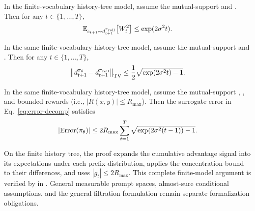 \begin{lemma}
\label{lem:wt-second-moment}
In the finite-vocabulary history-tree model, assume the mutual-support  and .
Then for any $t\in\{1,\ldots,T\}$,
\begin{equation*}
    \mathbb{E}_{c_{t+1}\sim d_{t+1}^{\pi_{\mathrm{roll}}}}\!\left[W_t^2\right] \le \exp(2\sigma^2 t).
\end{equation*}
\end{lemma}

\begin{corollary}
\label{cor:tv-prefix-subgaussian}
In the same finite-vocabulary history-tree model, assume the mutual-support  and
. Then for any $t\in\{1,\ldots,T\}$,
\begin{equation*}
    \bigl\|d_{t+1}^{\pi_{\theta}} - d_{t+1}^{\pi_{\mathrm{roll}}}\bigr\|_{\mathrm{TV}}
    \le
    \frac{1}{2}\sqrt{\exp(2\sigma^2 t) - 1}.
\end{equation*}
\end{corollary}

\begin{theorem}
\label{thm:per-position-error-subgaussian}
In the same finite-vocabulary history-tree model, assume the mutual-support ,
, and bounded rewards (i.e., $|R(x,y)|\le R_{\max}$). Then the surrogate error in
Eq.~\eqref{eq:error-decomp} satisfies
\begin{equation*}
    |\mathrm{Error}(\pi_{\theta})|
    \le
    2R_{\max}\sum_{t=1}^{T}\sqrt{\exp(2\sigma^2 (t-1)) - 1}.
\end{equation*}
\end{theorem}

On the finite history tree, the proof expands the cumulative advantage signal
into its expectations under each prefix distribution, applies the concentration
bound to their differences, and uses $|g_t|\le 2R_{\max}$.
This complete finite-model argument is verified by
 in .
General measurable prompt spaces, almost-sure conditional assumptions, and
the general filtration formulation remain separate formalization obligations.

